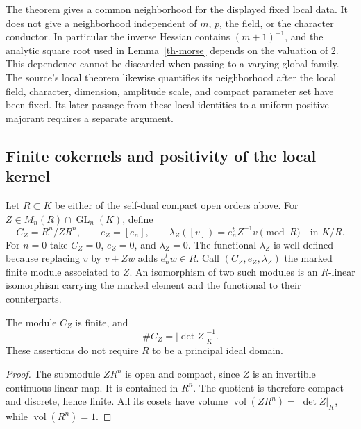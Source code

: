 \begin{remark}\label{th-uniformity-limit}
The theorem gives a common neighborhood for the displayed fixed local
data.  It does not give a neighborhood independent of $m$, $p$, the
field, or the character conductor.  In particular the inverse Hessian
contains $(m+1)^{-1}$, and the analytic square root used in
Lemma~\ref{th-morse} depends on the valuation of $2$.  This dependence
cannot be discarded when passing to a varying global family.
The source's local theorem likewise quantifies its neighborhood after
the local field, character, dimension, amplitude scale, and compact
parameter set have been fixed.  Its later passage from these local
identities to a uniform positive majorant requires a separate argument.
\end{remark}

\subsection{Finite cokernels and positivity of the local kernel}

Let $R\subset K$ be either of the self-dual compact open orders above.
For $Z\in M_n(R)\cap\operatorname{GL}_n(K)$, define
\[
 C_Z=R^n/ZR^n,\qquad e_Z=[e_n],\qquad
 \lambda_Z([v])=e_n^tZ^{-1}v\pmod R\quad\text{in }K/R.
\]
For $n=0$ take $C_Z=0$, $e_Z=0$, and $\lambda_Z=0$.
The functional $\lambda_Z$ is well-defined because replacing $v$ by
$v+Zw$ adds $e_n^tw\in R$.  Call $(C_Z,e_Z,\lambda_Z)$ the marked
finite module associated to $Z$.  An isomorphism of two such modules
is an $R$-linear isomorphism carrying the marked element and the
functional to their counterparts.

\begin{lemma}\label{th-coker}
The module $C_Z$ is finite, and
\[
 \#C_Z=|\det Z|_K^{-1}.
\]
These assertions do not require $R$ to be a principal ideal domain.
\end{lemma}

\begin{proof}
The submodule $ZR^n$ is open and compact, since $Z$ is an invertible
continuous linear map.  It is contained in $R^n$.  The quotient is
therefore compact and discrete, hence finite.  All its cosets have
volume $\operatorname{vol}(ZR^n)=|\det Z|_K$, while
$\operatorname{vol}(R^n)=1$.
\end{proof}

